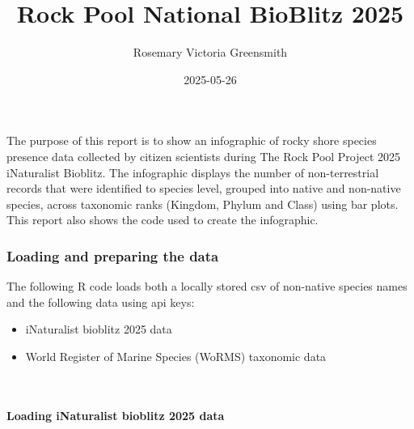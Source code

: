 \documentclass[
  12pt,
]{article}
\title{Rock Pool National BioBlitz 2025}
\author{Rosemary Victoria Greensmith}
\date{2025-05-26}
\providecommand{\tightlist}{%
  \setlength{\itemsep}{0pt}\setlength{\parskip}{0pt}}
\begin{document}
\maketitle

\hfill\break
The purpose of this report is to show an infographic of rocky shore
species presence data collected by citizen scientists during The Rock
Pool Project 2025 iNaturalist Bioblitz. The infographic displays the
number of non-terrestrial records that were identified to species level,
grouped into native and non-native species, across taxonomic ranks
(Kingdom, Phylum and Class) using bar plots. This report also shows the
code used to create the infographic.

\hfill\break
\hfill\break

\subsubsection{Loading and preparing the
data}\label{loading-and-preparing-the-data}

The following R code loads both a locally stored csv of non-native
species names and the following data using api keys:

\begin{itemize}
\tightlist
\item
  iNaturalist bioblitz 2025 data
\item
  World Register of Marine Species (WoRMS) taxonomic data\\
  \strut \\
\end{itemize}

\paragraph{Loading iNaturalist bioblitz 2025
data}\label{loading-inaturalist-bioblitz-2025-data}
\end{document}
